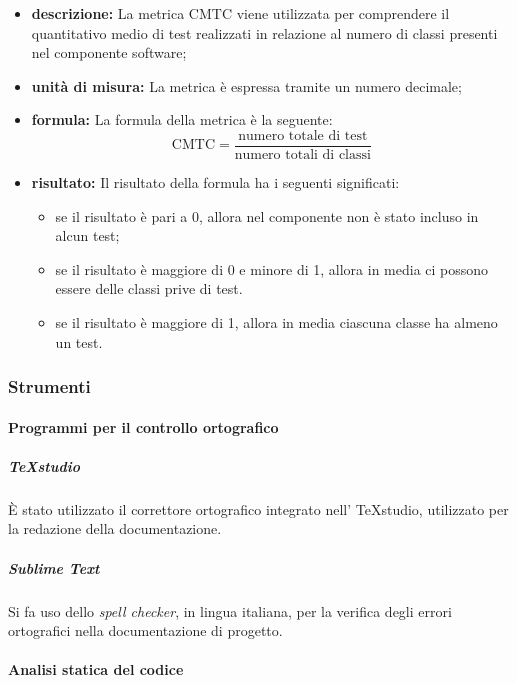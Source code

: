             \begin{itemize}
            \item \textbf{descrizione: }
                La metrica CMTC viene utilizzata per comprendere il quantitativo medio di test realizzati in relazione al numero di classi presenti nel componente software;
            \item \textbf{unità di misura: }
                La metrica è espressa tramite un numero decimale;
            \item \textbf{formula: }
                La formula della metrica è la seguente:
                \[ 
                    \text{CMTC} = \frac{\text{numero totale di test}}{\text{numero totali di classi}}
                \]
            \item \textbf{risultato: }
                Il risultato della formula ha i seguenti significati:
                \begin{itemize}
                    \item se il risultato è pari a 0, allora nel componente non è stato incluso in alcun test;
                    \item se il risultato è maggiore di 0 e minore di 1, allora in media ci possono essere delle classi prive di test.
                    \item se il risultato è maggiore di 1, allora in media ciascuna classe ha almeno un test.
                \end{itemize}
            \end{itemize}


        \subsubsection{Strumenti}

            \paragraph{Programmi per il controllo ortografico}

                \subparagraph{TeXstudio}
                	È stato utilizzato il correttore ortografico integrato nell' TeXstudio, utilizzato per la redazione della documentazione.

                \subparagraph{Sublime Text}
                    Si fa uso dello \textit{spell checker}, in lingua italiana, per la verifica degli errori ortografici nella documentazione di progetto.

            \paragraph{Analisi statica del codice}

